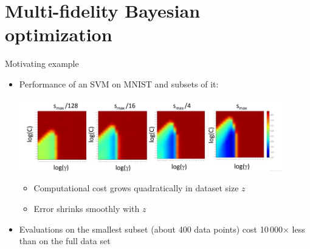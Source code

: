 \section{Multi-fidelity Bayesian optimization}
\begin{frame}[c]{Motivating example}

\begin{itemize}
    \item Performance of an SVM on MNIST and subsets of it:\\~\\
	    \includegraphics[width=0.9\textwidth]{../w07_hpo_speedup/images/fabolas/example_mnist.jpg}
	    \begin{itemize}
            \item Computational cost grows quadratically in dataset size $z$
            \item Error shrinks smoothly with $z$
        \end{itemize}
	\item Evaluations on the smallest subset (about 400 data points) cost 10\,000$\times$ less than on the full data set
    
\end{itemize}
\end{frame}

